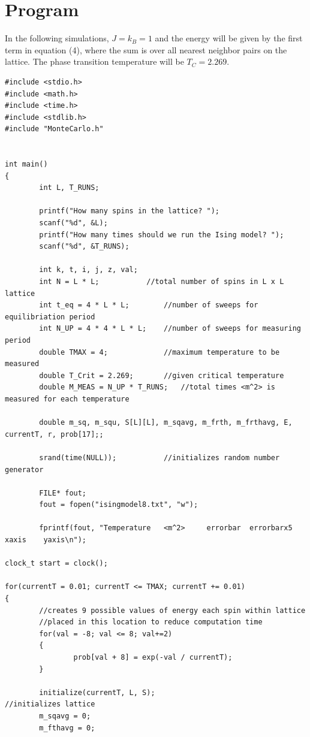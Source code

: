 \documentclass[10pt]{article}
\begin{document}
\section{Program}
In the following simulations, $J = k_B = 1$ and the energy will be given by the first term in equation (4), where the sum is over all nearest neighbor pairs on the lattice. The phase transition temperature will be $T_C = 2.269$. 

\begin{verbatim}
#include <stdio.h>
#include <math.h>
#include <time.h>
#include <stdlib.h>
#include "MonteCarlo.h"


int main()
{
        int L, T_RUNS;
        
        printf("How many spins in the lattice? ");
        scanf("%d", &L);
        printf("How many times should we run the Ising model? ");
        scanf("%d", &T_RUNS);
        
        int k, t, i, j, z, val;
        int N = L * L;			 //total number of spins in L x L lattice
        int t_eq = 4 * L * L;		 //number of sweeps for equilibriation period
        int N_UP = 4 * 4 * L * L;	 //number of sweeps for measuring period
        double TMAX = 4; 	         //maximum temperature to be measured
        double T_Crit = 2.269;		 //given critical temperature
        double M_MEAS = N_UP * T_RUNS;   //total times <m^2> is measured for each temperature
        
        double m_sq, m_squ, S[L][L], m_sqavg, m_frth, m_frthavg, E, currentT, r, prob[17];;
        
        srand(time(NULL));	         //initializes random number generator
        
        FILE* fout;
        fout = fopen("isingmodel8.txt", "w");
        
        fprintf(fout, "Temperature   <m^2>     errorbar  errorbarx5  xaxis    yaxis\n");

clock_t start = clock();

for(currentT = 0.01; currentT <= TMAX; currentT += 0.01)
{
        //creates 9 possible values of energy each spin within lattice
        //placed in this location to reduce computation time
        for(val = -8; val <= 8; val+=2)
        {
                prob[val + 8] = exp(-val / currentT);    
        }                                             
        
        initialize(currentT, L, S);                         //initializes lattice
        m_sqavg = 0;
        m_fthavg = 0;


\end{verbatim}
\end{document}
